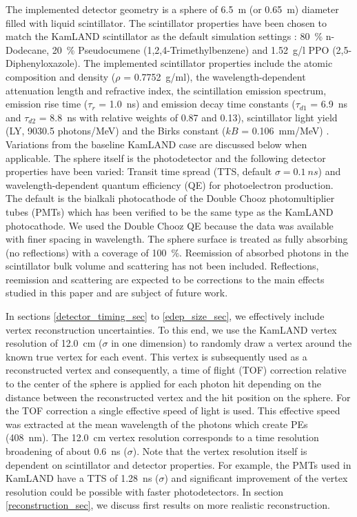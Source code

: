 \documentclass[aps,prc,twocolumn,groupedaddress,showpacs,amsmath,amssymb,floatfix,superscriptaddress]{revtex4}
\begin{document}
The implemented detector geometry is a sphere of 6.5~m (or 0.65~m) diameter filled with liquid scintillator. The scintillator properties have been chosen to match the KamLAND scintillator as the default simulation settings \cite{tbd}: 80~\% n-Dodecane, 20~\% Pseudocumene (1,2,4-Trimethylbenzene) and 1.52~g/l PPO (2,5-Diphenyloxazole). The implemented scintillator properties include the atomic composition and density ($\rho$ = 0.7752~g/ml), the wavelength-dependent attenuation length and refractive index, the scintillation emission spectrum, emission rise time ($\tau_r$ = 1.0~ns) and emission decay time constants ($\tau_{d1}$ = 6.9~ns and $\tau_{d2}$ = 8.8~ns with relative weights of 0.87 and 0.13), scintillator light yield (LY, 9030.5 photons/MeV) and the Birks constant ($kB$ = 0.106~mm/MeV) \cite{tbd}. Variations from the baseline KamLAND case are discussed below when applicable. The sphere itself is the photodetector and the following detector properties have been varied: Transit time spread (TTS, default $\sigma = 0.1~ns$) and wavelength-dependent quantum efficiency (QE) for photoelectron production. The default is the bialkali photocathode of the Double Chooz photomultiplier tubes (PMTs) \cite{tbd} which has been verified to be the same type as the KamLAND photocathode. We used the Double Chooz QE because the data was available with finer spacing in wavelength. The sphere surface is treated as fully absorbing (no reflections) with a coverage of 100~\%. Reemission of absorbed photons in the scintillator bulk volume and scattering has not been included. Reflections, reemission and scattering are expected to be corrections to the main effects studied in this paper and are subject of future work. 

In sections \ref{detector_timing_sec} to \ref{edep_size_sec}, we effectively include vertex reconstruction uncertainties. To this end, we use the KamLAND vertex resolution of 12.0~cm \cite{tbd} ($\sigma$ in one dimension) to randomly draw a vertex around the known true vertex for each event. This vertex is subsequently used as a reconstructed vertex and consequently, a time of flight (TOF) correction relative to the center of the sphere is applied for each photon hit depending on the distance between the reconstructed vertex and the hit position on the sphere. For the TOF correction a single effective speed of light is used. This effective speed was extracted at the mean wavelength of the photons which create PEs (408~nm). The 12.0~cm vertex resolution corresponds to a time resolution broadening of about 0.6~ns ($\sigma$). Note that the vertex resolution itself is dependent on scintillator and detector properties. For example, the PMTs used in KamLAND have a TTS of 1.28~ns ($\sigma$) and significant improvement of the vertex resolution could be possible with faster photodetectors. In section \ref{reconstruction_sec}, we discuss first results on more realistic reconstruction.
\end{document}
